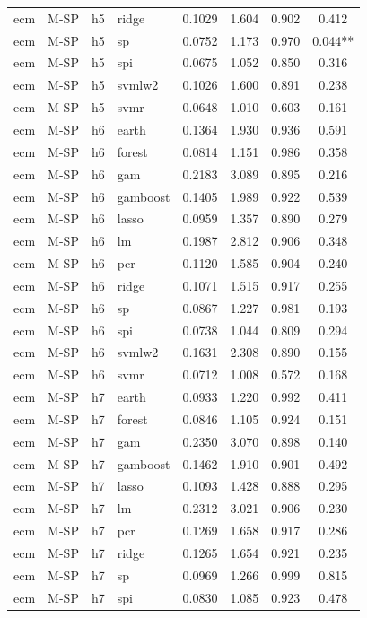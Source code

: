 \begin{ThreePartTable}
\begin{longtable}[t]{llclcccc}
ecm & M-SP & h5 & ridge & 0.1029 & 1.604 & 0.902 & 0.412\\
ecm & M-SP & h5 & sp & 0.0752 & 1.173 & 0.970 & 0.044**\\
ecm & M-SP & h5 & spi & 0.0675 & 1.052 & 0.850 & 0.316\\
ecm & M-SP & h5 & svmlw2 & 0.1026 & 1.600 & 0.891 & 0.238\\
ecm & M-SP & h5 & svmr & 0.0648 & 1.010 & 0.603 & 0.161\\
\addlinespace
ecm & M-SP & h6 & earth & 0.1364 & 1.930 & 0.936 & 0.591\\
ecm & M-SP & h6 & forest & 0.0814 & 1.151 & 0.986 & 0.358\\
ecm & M-SP & h6 & gam & 0.2183 & 3.089 & 0.895 & 0.216\\
ecm & M-SP & h6 & gamboost & 0.1405 & 1.989 & 0.922 & 0.539\\
ecm & M-SP & h6 & lasso & 0.0959 & 1.357 & 0.890 & 0.279\\
ecm & M-SP & h6 & lm & 0.1987 & 2.812 & 0.906 & 0.348\\
ecm & M-SP & h6 & pcr & 0.1120 & 1.585 & 0.904 & 0.240\\
ecm & M-SP & h6 & ridge & 0.1071 & 1.515 & 0.917 & 0.255\\
ecm & M-SP & h6 & sp & 0.0867 & 1.227 & 0.981 & 0.193\\
ecm & M-SP & h6 & spi & 0.0738 & 1.044 & 0.809 & 0.294\\
ecm & M-SP & h6 & svmlw2 & 0.1631 & 2.308 & 0.890 & 0.155\\
ecm & M-SP & h6 & svmr & 0.0712 & 1.008 & 0.572 & 0.168\\
\addlinespace
ecm & M-SP & h7 & earth & 0.0933 & 1.220 & 0.992 & 0.411\\
ecm & M-SP & h7 & forest & 0.0846 & 1.105 & 0.924 & 0.151\\
ecm & M-SP & h7 & gam & 0.2350 & 3.070 & 0.898 & 0.140\\
ecm & M-SP & h7 & gamboost & 0.1462 & 1.910 & 0.901 & 0.492\\
ecm & M-SP & h7 & lasso & 0.1093 & 1.428 & 0.888 & 0.295\\
ecm & M-SP & h7 & lm & 0.2312 & 3.021 & 0.906 & 0.230\\
ecm & M-SP & h7 & pcr & 0.1269 & 1.658 & 0.917 & 0.286\\
ecm & M-SP & h7 & ridge & 0.1265 & 1.654 & 0.921 & 0.235\\
ecm & M-SP & h7 & sp & 0.0969 & 1.266 & 0.999 & 0.815\\
ecm & M-SP & h7 & spi & 0.0830 & 1.085 & 0.923 & 0.478\\

\end{longtable}
\end{ThreePartTable}
